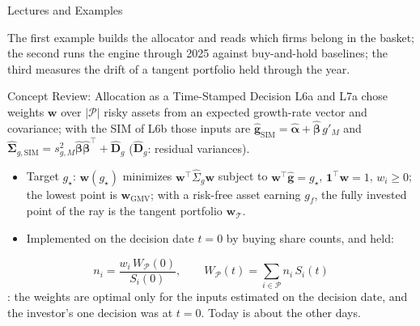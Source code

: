 \documentclass[aspectratio=169,11pt]{beamer}
\newcommand{\bg}{\mathbf{g}}
\newcommand{\bw}{\mathbf{w}}
\newcommand{\bal}{\boldsymbol{\alpha}}
\newcommand{\bbe}{\boldsymbol{\beta}}
\newcommand{\Tan}{\mathcal{T}}
\newcommand{\WP}{W_{\mathcal{P}}}
\newcommand{\np}{|\mathcal P|}
\newcommand{\SigSIM}{\hat{\boldsymbol{\Sigma}}_{g,\mathrm{SIM}}}
\newcommand{\gSIM}{\hat{\bg}_{\mathrm{SIM}}}
\begin{document}
\begin{frame}{Lectures and Examples}
  \vspace{0.3em}
  {\normalsize\textbf{}\par
  }

  \vspace{0.6em}
  {\normalsize\textbf{}\par
  }

  \vspace{0.6em}
  {\normalsize\textbf{}\par
  }

  \vspace{0.6em}
  {\normalsize\textbf{}\par
  }

  \vspace{0.5em}
  The first example builds the allocator and reads which firms belong in the
  basket; the second runs the engine through 2025 against buy-and-hold baselines;
  the third measures the drift of a tangent portfolio held through the year.
\end{frame}

\begin{frame}{Concept Review: Allocation as a Time-Stamped Decision}
  L6a and L7a chose weights $\bw$ over $\np$ risky assets from an expected
  growth-rate vector and covariance; with the SIM of L6b those inputs are
  $\gSIM=\hat{\bal}+\hat{\bbe}\,g'_M$ and
  $\SigSIM=s^2_{g,M}\hat{\bbe}\hat{\bbe}^{\top}+\hat{\mathbf D}_g$
  ($\hat{\mathbf D}_g$: residual variances).
  \begin{itemize}\setlength{\itemsep}{0.3em}
    \item Target $g_\star$: $\bw(g_\star)$ minimizes $\bw^{\top}\hat{\Sigma}_g\bw$
      subject to $\bw^{\top}\hat{\bg}=g_\star$, $\mathbf 1^{\top}\bw=1$, $w_i\ge0$;
      the lowest point is $\bw_{\mathrm{GMV}}$; with a risk-free asset earning
      $g_f$, the fully invested point of the ray is the tangent portfolio $\bw_{\Tan}$.
    \item Implemented on the decision date $t=0$ by buying share counts, and held:
  \end{itemize}
  \[
    n_i=\frac{w_i\,\WP(0)}{S_i(0)},\qquad
    \WP(t)=\sum_{i\in\mathcal P}n_i\,S_i(t)
  \]
  : the weights are optimal only for the
  inputs estimated on the decision date, and the investor's one decision was at
  $t=0$. Today is about the other days.
\end{frame}
\end{document}
